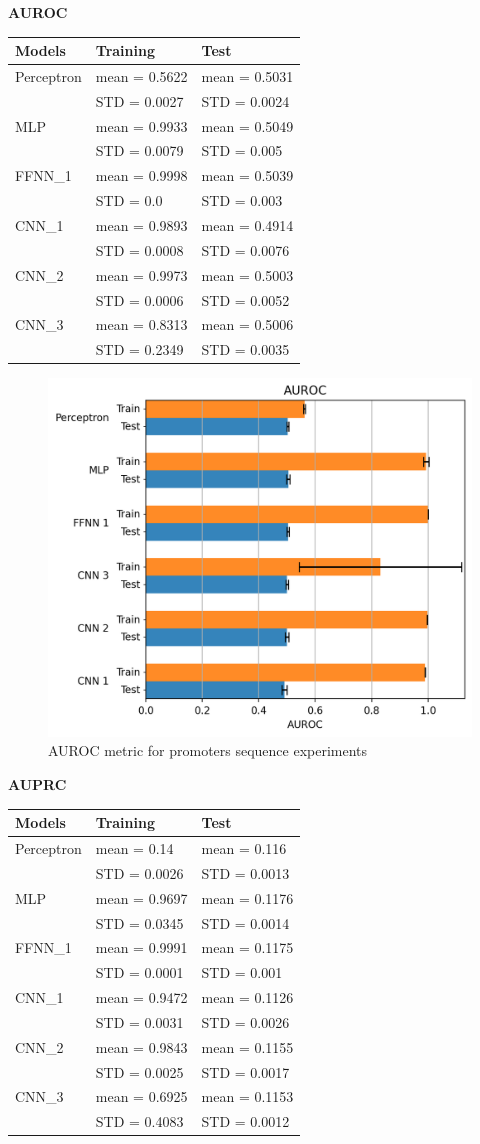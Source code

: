 \textbf{AUROC}

\begin{longtable}[]{@{}lll@{}}
\toprule
\textbf{Models} & \textbf{Training} & \textbf{Test}\tabularnewline
\midrule
\endhead
Perceptron & mean = 0.5622 & mean = 0.5031\tabularnewline
& STD = 0.0027 & STD = 0.0024\tabularnewline
MLP & mean = 0.9933 & mean = 0.5049\tabularnewline
& STD = 0.0079 & STD = 0.005\tabularnewline
FFNN\_1 & mean = 0.9998 & mean = 0.5039\tabularnewline
& STD = 0.0 & STD = 0.003\tabularnewline
CNN\_1 & mean = 0.9893 & mean = 0.4914\tabularnewline
& STD = 0.0008 & STD = 0.0076\tabularnewline
CNN\_2 & mean = 0.9973 & mean = 0.5003\tabularnewline
& STD = 0.0006 & STD = 0.0052\tabularnewline
CNN\_3 & mean = 0.8313 & mean = 0.5006\tabularnewline
& STD = 0.2349 & STD = 0.0035\tabularnewline
\bottomrule
\end{longtable}

\begin{figure}[h!]
\centering
\includegraphics[width=0.8\linewidth]{../images/sequence_results/promoters/auroc.png}
\caption{AUROC metric for promoters sequence experiments}
\end{figure}
\newpage
\textbf{AUPRC}

\begin{longtable}[]{@{}lll@{}}
\toprule
\textbf{Models} & \textbf{Training} & \textbf{Test}\tabularnewline
\midrule
\endhead
Perceptron & mean = 0.14 & mean = 0.116\tabularnewline
& STD = 0.0026 & STD = 0.0013\tabularnewline
MLP & mean = 0.9697 & mean = 0.1176\tabularnewline
& STD = 0.0345 & STD = 0.0014\tabularnewline
FFNN\_1 & mean = 0.9991 & mean = 0.1175\tabularnewline
& STD = 0.0001 & STD = 0.001\tabularnewline
CNN\_1 & mean = 0.9472 & mean = 0.1126\tabularnewline
& STD = 0.0031 & STD = 0.0026\tabularnewline
CNN\_2 & mean = 0.9843 & mean = 0.1155\tabularnewline
& STD = 0.0025 & STD = 0.0017\tabularnewline
CNN\_3 & mean = 0.6925 & mean = 0.1153\tabularnewline
& STD = 0.4083 & STD = 0.0012\tabularnewline
\bottomrule
\end{longtable}

